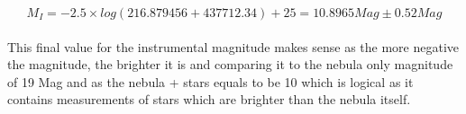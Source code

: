 \documentclass[12pt]{article}
\begin{document}
\begin{equation}
M_I = -2.5 \times log(216.879456 + 437712.34) + 25 = 10.8965 Mag \pm 0.52 Mag
\end{equation} \\

This final value for the instrumental magnitude makes sense as the more negative the magnitude, the brighter it is and comparing it to the nebula only magnitude of 19 Mag and as the nebula + stars equals to be 10 which is logical as it contains measurements of stars which are brighter than the nebula itself.  \\



\end{document}
